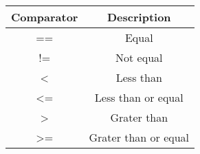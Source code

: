 		\begin{tabular}{c|c}
			\textbf{Comparator} & \textbf{Description}\\
			\hline
			==	& Equal \\
			!= & Not equal \\
			< & Less than \\
			<= & Less than or equal \\
			> & Grater than \\
			>= & Grater than or equal
		\end{tabular}